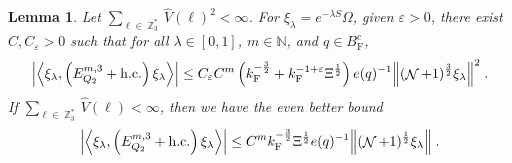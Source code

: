 \documentclass[12pt,a4paper]{article}
\numberwithin{equation}{section}
\newcommand{\NNN}{\mathbb{N}}
\newcommand{\1}{\mathbb{I}}
\newcommand{\F}{\mathrm{F}}
\DeclareMathOperator{\Z}{\mathbb{Z}}
\DeclareMathOperator{\NN}{\mathcal{N}}
\newcommand{\half}{\frac{1}{2}}
\newcommand{\eva}[1]{\left\langle #1 \right\rangle}
\theoremstyle{plain}
\newtheorem{lemma}[theorem]{Lemma}
\theoremstyle{definition}
\theoremstyle{remark}
\theoremstyle{plain}
\theoremstyle{definition}
\theoremstyle{remark}
\begin{document}
\begin{lemma} \label{lem:EQ215}
Let $ \sum_{\ell \in \Z_3^*} \hat{V}(\ell)^2 < \infty $. For $\xi_\lambda = e^{-\lambda S} \Omega$, given $ \varepsilon > 0 $, there exist $ C, C_\varepsilon > 0 $ such that for all $ \lambda \in [0,1] $, $ m \in \NNN $, and $ q \in B_{\F}^c $,
\begin{equation} \label{eq:estEQ215_Coulomb}
\begin{aligned}
	\abs{\eva{\xi_\lambda,\left(E^{m,3}_{Q_2}+\mathrm{h.c.}\right) \xi_\lambda }}\nonumber
	\leq C_\varepsilon C^m \left( k_{\F}^{-\frac 32}
		+ k_{\F}^{-1 + \varepsilon} \Xi^\half \right)
		e(q)^{-1}
		\norm{(\NN+1)^{\frac 32} \xi_\lambda }^2 \;.
\end{aligned}
\end{equation}
If $ \sum_{\ell \in \Z_3^*} \hat{V}(\ell) < \infty $, then we have the even better bound
\begin{equation} \label{eq:estEQ215}
\begin{aligned}
	\abs{\eva{\xi_\lambda,\left(E^{m,3}_{Q_2}+\mathrm{h.c.}\right) \xi_\lambda }}\nonumber
	\leq C^m k_{\F}^{-\frac{3}{2}} \Xi^{\half} e(q)^{-1}
		\norm{(\NN+1)^\half \xi_\lambda } \;.
\end{aligned}
\end{equation}
\end{lemma}
\end{document}
